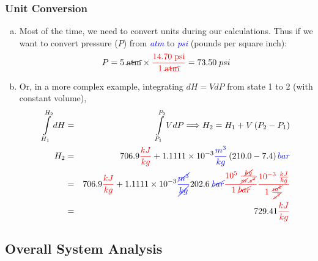 \documentclass[10pt,compress,handout,ignorenonframetext]{beamer}
\newcommand{\blue}{\textcolor{blue}}
\begin{document}
\begin{frame}
 \frametitle{Unit Conversion}
  \begin{enumerate}[(a)]
   \item<1-> Most of the time, we need to convert units during our calculations. Thus if we want to convert pressure ($P$) from \blue{\it atm} to \blue{\it psi} (pounds per square inch):
      \begin{displaymath}
        P = 5\;\cancel{\text{atm}} \times \textcolor{red}{\displaystyle\frac{14.70\;\text{psi}}{1\;\cancel{\text{atm}}}} = 73.50\;psi
      \end{displaymath}
   \item<2-> Or, in a more complex example, integrating $dH=VdP$ from state 1 to 2 (with constant volume),
      \begin{eqnarray}
        \int\limits_{H_{1}}^{H_{2}}dH &=& \int\limits_{P_{1}}^{P_{2}}VdP \Longrightarrow H_{2} = H_{1} + V\left(P_{2}-P_{1}\right) \nonumber \\
         H_{2} &=& 706.9\textcolor{red}{\frac{kJ}{kg}} + 1.1111\times 10^{-3}\textcolor{blue}{\frac{m^{3}}{kg}}\left(210.0-7.4\right)\textcolor{blue}{bar} \nonumber \\
              &=& 706.9\textcolor{red}{\frac{kJ}{kg}} + 1.1111\times 10^{-3}\textcolor{blue}{\frac{\cancel{m^{3}}}{\cancel{kg}}} 202.6\;\textcolor{blue}{\cancel{bar}} \textcolor{red}{\frac{10^{5}\;\frac{\cancel{kg}}{\cancel{m}.\cancel{s^{2}}}}{1\; \cancel{bar}}} \textcolor{red}{\frac{10^{-3}\; \frac{kJ}{kg}}{1\;\frac{\cancel{m^{2}}}{\cancel{s^{2}}}}} \nonumber \\
              &=& 729.41\textcolor{red}{\frac{kJ}{kg}} \nonumber 
      \end{eqnarray} 
  \end{enumerate}
\end{frame}



\subsection{Overall System Analysis}
\end{document}
